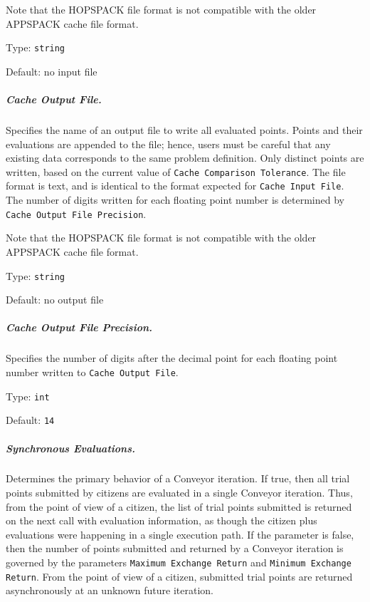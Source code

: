 \noindent
Note that the HOPSPACK file format is not compatible with the older APPSPACK
cache file format.

\hspace{0.2in}
Type: {\tt string}

\hspace{0.2in}
Default: no input file

\subparagraph{Cache Output File.}  \label{param:MD-cacheoutfile}
Specifies the name of an output file to write all evaluated
points.  Points and their evaluations are appended to the file; hence,
users must be careful that any existing data corresponds to the same problem
definition.
Only distinct points are written, based on the current value of
{\tt Cache Comparison Tolerance}.
The file format is text, and is identical to the format expected for
{\tt Cache Input File}.
The number of digits written for each floating point number is determined by
{\tt Cache Output File Precision}.

\noindent
Note that the HOPSPACK file format is not compatible with the older APPSPACK
cache file format.

\hspace{0.2in}
Type: {\tt string}

\hspace{0.2in}
Default: no output file

\subparagraph{Cache Output File Precision.}  \label{param:MD-cacheoutfileprec}
Specifies the number of digits after the decimal point
for each floating point number written to {\tt Cache Output File}.

\hspace{0.2in}
Type: {\tt int}

\hspace{0.2in}
Default: {\tt 14}

\subparagraph{Synchronous Evaluations.}  \label{param:MD-synch}
Determines the primary behavior of a Conveyor iteration.
If true, then all trial points submitted by citizens are evaluated in a single
Conveyor iteration.  Thus, from the point of view of a citizen, the list of
trial points submitted is returned on the next call with evaluation information,
as though the citizen plus evaluations were happening in a single execution path.
If the parameter is false, then the number of points submitted and returned
by a Conveyor iteration is governed by the parameters
{\tt Maximum Exchange Return} and {\tt Minimum Exchange Return}.
From the point of view of a citizen, submitted
trial points are returned asynchronously at an unknown future iteration.

